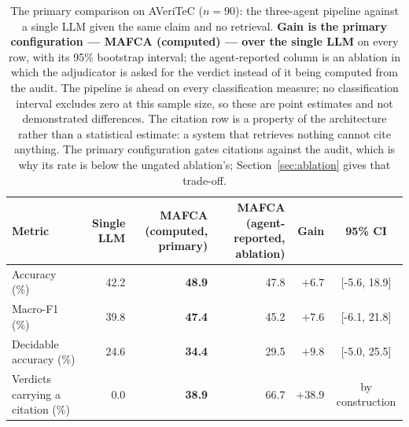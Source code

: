 \begin{table}[t]
\centering
\caption{The primary comparison on AVeriTeC ($n = 90$): the three-agent pipeline against a single LLM given the same claim and no retrieval. \textbf{Gain is the primary configuration --- MAFCA (computed) --- over the single LLM} on every row, with its 95\% bootstrap interval; the agent-reported column is an ablation in which the adjudicator is asked for the verdict instead of it being computed from the audit. The pipeline is ahead on every classification measure; no classification interval excludes zero at this sample size, so these are point estimates and not demonstrated differences. The citation row is a property of the architecture rather than a statistical estimate: a system that retrieves nothing cannot cite anything. The primary configuration gates citations against the audit, which is why its rate is below the ungated ablation's; Section~\ref{sec:ablation} gives that trade-off.}
\label{tab:cond:headline}
\small
\begin{tabular}{@{}lrrrrc@{}}
\toprule
Metric & Single LLM & \shortstack{MAFCA\\(computed, primary)} & \shortstack{MAFCA\\(agent-reported, ablation)} & Gain & 95\% CI \\
\midrule
Accuracy (\%) & 42.2 & \textbf{48.9} & 47.8 & $\mathbf{+6.7}$ & [-5.6, 18.9] \\
Macro-F1 (\%) & 39.8 & \textbf{47.4} & 45.2 & $\mathbf{+7.6}$ & [-6.1, 21.8] \\
Decidable accuracy (\%) & 24.6 & \textbf{34.4} & 29.5 & $\mathbf{+9.8}$ & [-5.0, 25.5] \\
Verdicts carrying a citation (\%) & 0.0 & \textbf{38.9} & 66.7 & $\mathbf{+38.9}$ & by construction \\
\bottomrule
\end{tabular}
\end{table}
